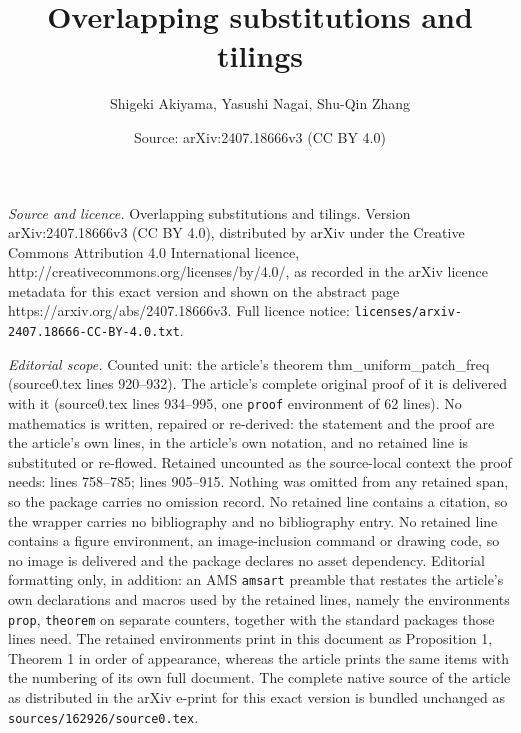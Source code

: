 \documentclass[10pt,a4paper]{amsart}
\title{Overlapping substitutions and tilings}
\author{Shigeki Akiyama, Yasushi Nagai, Shu-Qin Zhang}
\date{Source: arXiv:2407.18666v3 (CC BY 4.0)}
\begin{document}
\maketitle

\noindent\emph{Source and licence.} Overlapping substitutions and tilings. Version arXiv:2407.18666v3 (CC BY 4.0), distributed by arXiv under the Creative Commons Attribution 4.0 International licence, http://creativecommons.org/licenses/by/4.0/, as recorded in the arXiv licence metadata for this exact version and shown on the abstract page https://arxiv.org/abs/2407.18666v3. Full licence notice: \texttt{licenses/arxiv-2407.18666-CC-BY-4.0.txt}.\par\smallskip

\noindent\textit{Editorial scope.} Counted unit: the article's theorem thm\_uniform\_patch\_freq (source0.tex lines 920--932). The article's complete original proof of it is delivered with it (source0.tex lines 934--995, one \texttt{proof} environment of 62 lines). No mathematics is written, repaired or re-derived: the statement and the proof are the article's own lines, in the article's own notation, and no retained line is substituted or re-flowed.  Retained uncounted as the source-local context the proof needs: lines 758--785; lines 905--915.  Nothing was omitted from any retained span, so the package carries no omission record.  No retained line contains a citation, so the wrapper carries no bibliography and no bibliography entry.  No retained line contains a figure environment, an image-inclusion command or drawing code, so no image is delivered and the package declares no asset dependency.  Editorial formatting only, in addition: an AMS \texttt{amsart} preamble that restates the article's own declarations and macros used by the retained lines, namely the environments \texttt{prop}, \texttt{theorem} on separate counters, together with the standard packages those lines need.  The retained environments print in this document as Proposition 1, Theorem 1 in order of appearance, whereas the article prints the same items with the numbering of its own full document.  The complete native source of the article as distributed in the arXiv e-print for this exact version is bundled unchanged as \texttt{sources/162926/source0.tex}.
\end{document}
